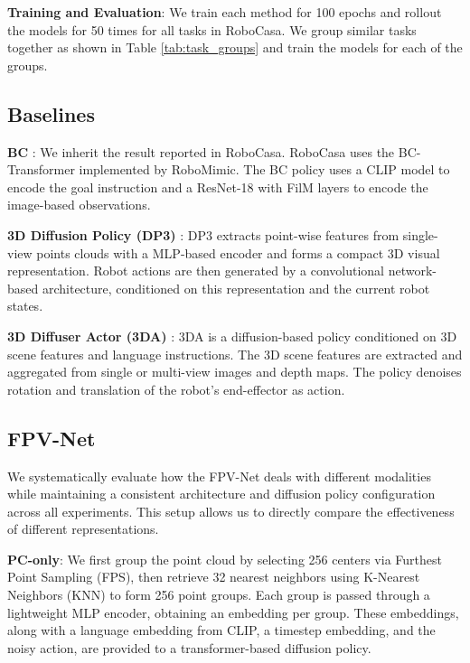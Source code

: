 \textbf{Training and Evaluation}: We train each method for 100 epochs and rollout the models for 50 times for all tasks in RoboCasa. We group similar tasks together as shown in Table \ref{tab:task_groups} and train the models for each of the groups. 

\subsection{Baselines}

\textbf{BC} \cite{robocasa2024}: We inherit the result reported in RoboCasa. RoboCasa uses the BC-Transformer implemented by RoboMimic. The BC policy uses a CLIP model to encode the goal instruction and a ResNet-18 with FilM layers to encode the image-based observations.

\textbf{3D Diffusion Policy (DP3)} \cite{ze20243d}: DP3
extracts point-wise features from single-view points clouds with a MLP-based encoder and forms a compact 3D visual representation. Robot actions are then generated by a convolutional network-based architecture, conditioned on this representation and the current robot states.

\textbf{3D Diffuser Actor (3DA)} \cite{ke20243d}: 3DA is a diffusion-based policy conditioned on 3D scene features and language instructions.
The 3D scene features are extracted and aggregated from single or multi-view images and depth maps. The policy denoises rotation and translation of the robot's end-effector as action.

\subsection{FPV-Net}
\label{sec:proposed_models}

We systematically evaluate how the FPV-Net deals with different modalities while maintaining a consistent architecture and diffusion policy configuration across all experiments. This setup allows us to directly compare the effectiveness of different representations.

\textbf{PC-only}:
We first group the point cloud by selecting 256 centers via Furthest Point Sampling (FPS), then retrieve 32 nearest neighbors using K-Nearest Neighbors (KNN) to form 256 point groups. Each group is passed through a lightweight MLP encoder, obtaining an embedding per group. These embeddings, along with a language embedding from CLIP, a timestep embedding, and the noisy action, are provided to a transformer-based diffusion policy.

